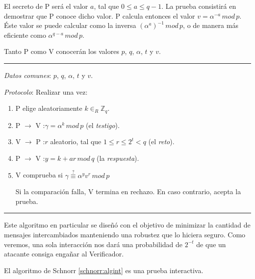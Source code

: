El secreto de P será el valor $a$, tal que $0\leq a \leq q-1$. La prueba consistirá en demostrar que P conoce dicho valor. P calcula entonces el valor $v = \alpha ^{-a} \, mod \, p$. Éste valor se puede calcular como la inversa $\left( \alpha ^{a} \right) ^{-1} \, mod \, p$, o de manera más eficiente como $\alpha ^{q-a} \, mod \, p$.

Tanto P como V conocerán los valores $p$, $q$, $\alpha$, $t$ y $v$.

\rule{\textwidth}{1pt}
\begin{algorithm}[Schnorr]\label{schnorr:algint}
	
	\hfil
	
	\textit{Datos comunes}: $p$, $q$, $\alpha$, $t$ y $v$.
	
	\textit{Protocolo}: Realizar una vez:
	
	\begin{enumerate}
		
		\item P elige aleatoriamente $k \in_R \mathbb{Z}_q$.
		
		\item P $\rightarrow$ V :\quad $\gamma = \alpha^k \, mod \, p$ (el \textit{testigo}).
		
		\item V $\rightarrow$ P :\quad $r$ aleatorio, tal que $1\leq r\leq 2^t < q $ (el \textit{reto}).
		
		\item P $\rightarrow$ V :\quad $y = k + ar \, mod \, q$ (la \textit{respuesta}).
		
		\item V comprueba si $\gamma \overset{?}{\equiv} \alpha^y v^r \, mod \, p$
		
		Si la comparación falla, V termina en rechazo. En caso contrario, acepta la prueba.
		
		
	\end{enumerate}
	
\end{algorithm}
\rule{\textwidth}{1pt}

\hfil

Este algoritmo en particular se diseñó con el objetivo de minimizar la cantidad de mensajes intercambiados manteniendo una robustez que lo hiciera seguro. Como veremos, una sola interacción nos dará una probabilidad de $2^{-t}$ de que un atacante consiga engañar al Verificador.


\begin{theorem}
	El algoritmo de Schnorr \ref{schnorr:algint} es una prueba interactiva.
\end{theorem}

